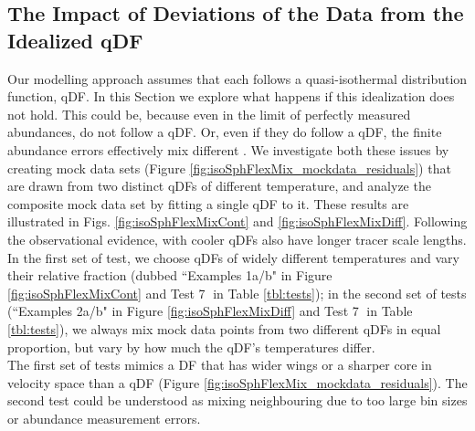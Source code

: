 \subsection{The Impact of Deviations of the Data from the Idealized qDF} \label{sec:results_mixedDFs}

Our modelling approach assumes that each \MAP follows a quasi-isothermal distribution function, qDF. In this Section we explore what happens if this idealization does not hold. This could be, because even in the limit of perfectly measured abundances, \MAPs do not follow a qDF. Or, even if they do follow a qDF, the finite abundance errors effectively mix different \MAPs. We investigate both these issues by creating mock data sets (Figure \ref{fig:isoSphFlexMix_mockdata_residuals}) that are drawn from two distinct qDFs of different temperature, and analyze the composite mock data set by fitting a single qDF to it. These results are illustrated in Figs. \ref{fig:isoSphFlexMixCont} and \ref{fig:isoSphFlexMixDiff}. Following the observational evidence, \MAPs with cooler qDFs also have longer tracer scale lengths. In the first set of test, we choose qDFs of widely different temperatures and vary their relative fraction (dubbed ``Examples 1a/b" in Figure \ref{fig:isoSphFlexMixCont} and Test \textcircled{7} in Table \ref{tbl:tests}); in the second set of tests (``Examples 2a/b" in Figure \ref{fig:isoSphFlexMixDiff} and Test \textcircled{7} in Table \ref{tbl:tests}), we always mix mock data points from two different qDFs in equal proportion, but vary by how much the qDF's temperatures differ. 
\\The first set of tests mimics a DF that has wider wings or a sharper core in velocity space than a qDF (Figure \ref{fig:isoSphFlexMix_mockdata_residuals}). The second test could be understood as mixing neighbouring \MAPs due to too large bin sizes or abundance measurement errors.

